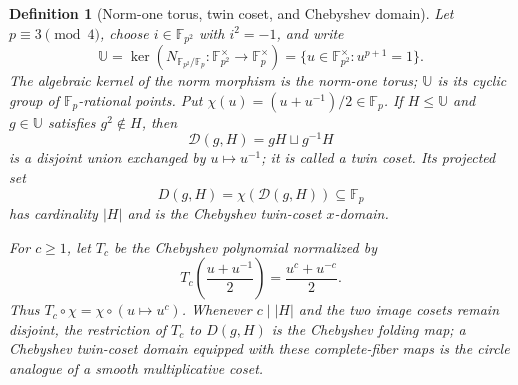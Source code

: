 \documentclass[12pt,a4paper]{amsart}
\numberwithin{equation}{section}
\newtheorem{definition}[definition]{Definition}
\theoremstyle{remark}
\newcommand{\F}{\mathbb F}
\newcommand{\Dcal}{\mathcal D}
\newcommand{\UU}{\mathbb U}
\newcommand{\abs}[1]{\lvert #1\rvert}
\begin{document}
\begin{definition}[Norm-one torus, twin coset, and Chebyshev domain]
\label{def:circle-twin-domain}
Let \(p\equiv3\pmod4\), choose \(i\in\F_{p^2}\) with \(i^2=-1\), and
write
\[
 \UU=\ker\!\left(N_{\F_{p^2}/\F_p}:\F_{p^2}^{\times}
                      \to\F_p^\times\right)
     =\{u\in\F_{p^2}^{\times}:u^{p+1}=1\}.
\]
The algebraic kernel of the norm morphism is the
\emph{norm-one torus}; \(\UU\) is its cyclic group of
\(\F_p\)-rational points.  Put
\(\chi(u)=(u+u^{-1})/2\in\F_p\).  If \(H\le\UU\) and
\(g\in\UU\) satisfies \(g^2\notin H\), then
\[
 \Dcal(g,H)=gH\sqcup g^{-1}H
\]
is a disjoint union exchanged by \(u\mapsto u^{-1}\); it is called a
\emph{twin coset}.  Its projected set
\[
             D(g,H)=\chi(\Dcal(g,H))\subseteq\F_p
\]
has cardinality \(\abs H\) and is the \emph{Chebyshev twin-coset
\(x\)-domain}.

For \(c\ge1\), let \(T_c\) be the Chebyshev polynomial normalized by
\[
       T_c\!\left(\frac{u+u^{-1}}2\right)
       =\frac{u^c+u^{-c}}2 .
\]
Thus \(T_c\circ\chi=\chi\circ(u\mapsto u^c)\).  Whenever
\(c\mid\abs H\) and the two image cosets remain disjoint, the restriction
of \(T_c\) to \(D(g,H)\) is the \emph{Chebyshev folding map}; a
Chebyshev twin-coset domain equipped with these complete-fiber maps is
the circle analogue of a smooth multiplicative coset.
\end{definition}
\end{document}
